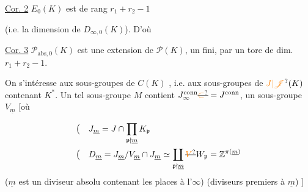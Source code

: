 \uline{Cor. 2} $E_0(K)$ est de rang $r_1+r_2-1$

(i.e. la dimension de $D_{\infty,0}(K)$). D'où

\uline{Cor. 3} $\mathscr{P}_{\mathrm{abs},0}(K)$ est une extension de $\mathscr{P}(K)$,  un  fini, par un tore de dim. $r_1+r_2-1$.

On s'intéresse aux sous-groupes  de $C(K)$ , i.e. aux sous-groupes  de $\unsure{J|\mathscr{J}}(K)$ contenant $K^*$. Un tel sous-groupe $M$ contient  $J_\infty^{\mathrm{conn}}\deleted{\unsure{\subset}}=J^{\mathrm{conn}}$,  un sous-groupe  $V_{\underline m}$ [où

\[
\begin{aligned}
\bigl(\quad&J_{\underline m}=J\cap\prod_{\mathfrak p\nmid\underline m}K_{\mathfrak p}\\
\bigl(\quad&D_{\underline m}=J_{\underline m}/V_{\underline m}\cap J_{\underline m}\simeq\coprod_{\mathfrak p\nmid\underline m}\deleted{\unsure{V}}W_{\mathfrak p}=\mathbb Z^{\pi(\underline m)}
\end{aligned}
\]
($\underline m$ est un diviseur absolu contenant les places à l'$\infty$)
(diviseurs premiers à $\underline m$)
]


